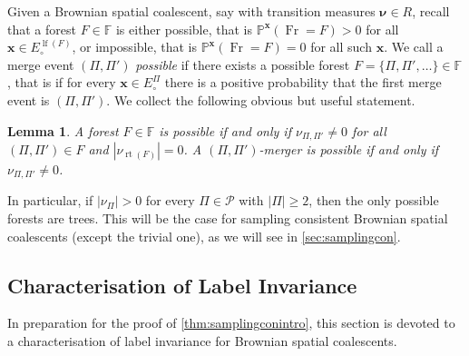\documentclass[reqno,draft]{amsart}
\numberwithin{equation}{section}
\theoremstyle{plain}
\newtheorem{lemma}[theorem]{Lemma}
\theoremstyle{remark}
\renewcommand{\P}{\mathbb{P}} %
\newcommand{\fpart}{\Pi} %
\newcommand{\nurates}{R} %
\DeclareMathOperator{\lf}{lf}
\DeclareMathOperator{\rt}{rt}
\DeclareMathOperator{\fr}{Fr}
\newcommand{\nut}[1]{|\nu_{#1}|}
\begin{document}
Given a Brownian spatial coalescent, say with transition measures $\boldsymbol \nu\in \nurates$, recall that a forest $F\in \mathbb{F}$ is either possible, that is $\P^{\boldsymbol x}(\fr = F) > 0$ for all $\boldsymbol x\in E^{\lf(F)}_\circ $, or impossible, that is $\P^{\boldsymbol x}(\fr = F) = 0$ for all such $\boldsymbol x$. We call a merge event $(\fpart,\fpart')$ \emph{possible} if there exists a possible forest $F = \{\fpart,\fpart', \ldots \}\in \mathbb{F}$, that is if for every $\boldsymbol x\in E^{\fpart}_\circ $ there is a positive probability that the first merge event is $(\fpart,\fpart')$. We collect the following obvious but useful statement.

\begin{lemma}
    A forest $F\in \mathbb{F}$ is possible if and only if $\nu_{\fpart,\fpart'} \neq 0$ for all $(\fpart,\fpart') \in F$ and $\nut{\rt(F)} = 0$. A $(\fpart,\fpart')$-merger is possible if and only if $\nu_{\fpart,\fpart'} \neq 0$.
\end{lemma}

In particular, if $\nut{\fpart} > 0$ for every $\fpart\in \mathcal{P}$ with $|\fpart| \ge 2$, then the only possible forests are trees. This will be the case for sampling consistent Brownian spatial coalescents (except the trivial one), as we will see in \cref{sec:samplingcon}.


\subsection{Characterisation of Label Invariance}
In preparation for the proof of \cref{thm:samplingconintro}, this section is devoted to a characterisation of label invariance for Brownian spatial coalescents.
\end{document}

